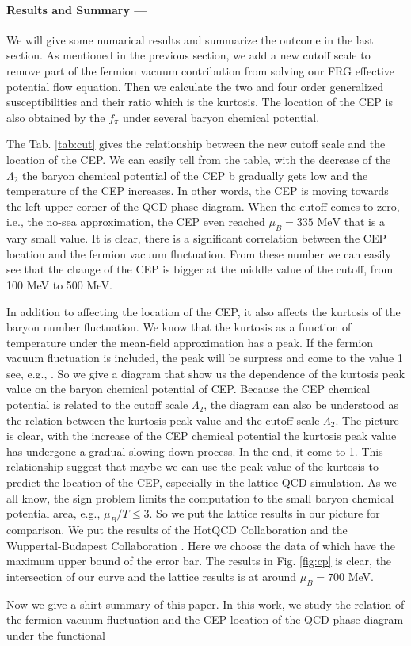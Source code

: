 \documentclass[%
reprint,
superscriptaddress,
showpacs,preprintnumbers,
 amsmath,amssymb,
 aps,
prl,
]{revtex4-1}
\begin{document}
\paragraph*{Results and Summary ---\!\!\!}
\label{sec:res}
We will give some numarical results and summarize the outcome in the last section. As mentioned in the previous section, we add a new cutoff scale to remove part of the fermion vacuum contribution from solving our FRG effective potential flow equation. Then we calculate the two and four order generalized susceptibilities and their ratio which is the kurtosis. The location of the CEP is also obtained by the $f_\pi$ under several baryon chemical potential. \par The Tab. \ref{tab:cut} gives the relationship between the new cutoff scale and the location of the CEP. We can easily tell from the table, with the decrease of the $\Lambda_2$ the baryon chemical potential of the CEP  b gradually gets low and the temperature of the CEP increases. In other words, the CEP is moving towards the left upper corner of the QCD phase diagram. When the cutoff comes to zero, i.e., the no-sea approximation, the CEP even reached $\mu_B=335\,\,\mathrm{MeV}$ that is a vary small value. It is clear, there is a significant correlation between the CEP location and the fermion vacuum fluctuation. From these number we can easily see that the change of the CEP is bigger at the middle value of the cutoff, from 100 MeV to 500 MeV.\par In addition to affecting the location of the CEP, it also affects the kurtosis of the baryon number fluctuation. We know that the kurtosis as a function of temperature under the mean-field approximation has a peak. If the fermion vacuum fluctuation is included, the peak will be surpress and come to the value 1 see, e.g., \cite{Skokov:2010sf}. So we give a diagram that show us the dependence of the kurtosis peak value on the baryon chemical potential of CEP. Because the CEP chemical potential is related to the cutoff scale $\Lambda_2$, the diagram can also be understood as the relation between the kurtosis peak value and the cutoff scale $\Lambda_2$. The picture is clear, with the increase of the CEP chemical potential the kurtosis peak value has undergone a gradual slowing down process. In the end, it come to 1. This relationship suggest that maybe we can use the peak value of the kurtosis to predict the location of the CEP, especially in the lattice QCD simulation.  As we all know, the sign problem limits the computation to the small baryon chemical potential area, e.g., $\mu_B/T\leqslant 3$. So we put the lattice results in our picture for comparison. We put the results of the HotQCD Collaboration \cite{Bazavov:2017dus,Bazavov:2017tot} and the Wuppertal-Budapest Collaboration \cite{Borsanyi:2013hza}. Here we choose the data of which have the maximum upper bound of the error bar. The results in Fig. \ref{fig:cp} is clear, the intersection of our curve and the lattice results is at around $\mu_B=700$ MeV. \par Now we give a shirt summary of this paper. In this work, we study the relation of the fermion vacuum fluctuation and the CEP location of the QCD phase diagram under the functional 
\end{document}
